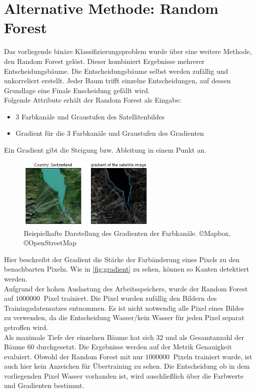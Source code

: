 \section{Alternative Methode: Random Forest}
\label{sec:Alternativ}
Das vorliegende binäre Klassifizierungsproblem wurde über eine weitere Methode, den Random Forest gelöst.
Dieser kombiniert Ergebnisse mehrerer Entscheidungsbäume.
Die Entscheidungsbäume selbst werden zufällig und unkorreliert erstellt.
Jeder Baum trifft einzelne Entscheidungen, auf dessen Grundlage eine Finale Enscheidung gefällt wird.
\\
Folgende Attribute erhält der Random Forest als Eingabe:
\begin{itemize}
    \setlength\itemsep{0.1em}
    \item 3 Farbkanäle und Graustufen des Satellitenbildes
    \item Gradient für die 3 Farbkanäle und Graustufen des Gradienten
\end{itemize}
Ein Gradient gibt die Steigung bzw. Ableitung in einem Punkt an.
\begin{figure}
    \centering
    \includegraphics[width=0.6\textwidth]{content/img/gradient.png}
    \caption{Beispielhafte Darstellung des Gradienten der Farbkanäle. \copyright Mapbox, \copyright OpenStreetMap}
    \label{fig:gradient}
\end{figure}
Hier beschreibt der Gradient die Stärke der Farbänderung eines Pixels zu den benachbarten Pixeln.
Wie in \autoref{fig:gradient} zu sehen, können so Kanten detektiert werden.
\\
Aufgrund der hohen Auslastung des Arbeitsspeichers, wurde der Random Forest auf $\SI{1000000}{}$ Pixel trainiert.
Die Pixel wurden zufällig den Bildern des Trainingsdatensatzes entnommen.
Es ist nicht notwendig alle Pixel eines Bildes zu verwenden, da die Entscheidung Wasser/kein Wasser für jeden Pixel separat getroffen wird.
\\
Als maximale Tiefe der einzelnen Bäume hat sich $32$ und als Gesamtanzahl der Bäume $60$ durchgesetzt.
Die Ergebnisse werden auf der Metrik Genauigkeit evaluiert.
Obwohl der Random Forest mit nur $\SI{1000000}{}$ Pixeln trainiert wurde, ist auch hier kein Anzeichen für Übertraining zu sehen.
Die Entscheidung ob in dem vorliegenden Pixel Wasser vorhanden ist, wird auschließlich über die Farbwerte und Gradienten bestimmt.
\FloatBarrier